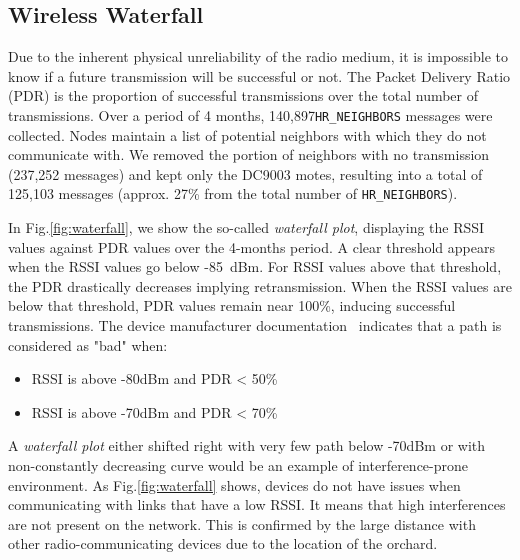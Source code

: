 \documentclass{sig-alternate}
\newcommand{\HRNEIGHBORS}    {{\tt HR\_NEIGHBORS}\xspace}
\newcommand{\HRNEIGHBORSTOTALNUMBER}     {140,897}
\begin{document}
\subsection{Wireless Waterfall}


Due to the inherent physical unreliability of the radio medium, it is impossible to know if a future transmission will be successful or not.
The Packet Delivery Ratio (PDR) is the proportion of successful transmissions over the total number of transmissions.
Over a period of 4 months, \HRNEIGHBORSTOTALNUMBER \HRNEIGHBORS messages were collected.
Nodes maintain a list of potential neighbors with which they do not communicate with.
We removed the portion of neighbors with no transmission (237,252 messages) and kept only the DC9003 motes, resulting into a total of 125,103 messages (approx. 27\% from the total number of \HRNEIGHBORS).


In Fig.\ref{fig:waterfall}, we show the so-called \textit{waterfall plot}, displaying the RSSI values against PDR values over the 4-months period.
A clear threshold appears when the RSSI values go below -85~dBm.
For RSSI values above that threshold, the PDR drastically decreases implying retransmission.
When the RSSI values are below that threshold, PDR values remain near 100\%, inducing successful transmissions.
The device manufacturer documentation~\cite{smip_app_note} indicates that a path is considered as "bad" when:

\begin{itemize}
  \item RSSI is above -80dBm and PDR < 50\%
  \item RSSI is above -70dBm and PDR < 70\%
\end{itemize}


A \textit{waterfall plot} either shifted right with very few path below -70dBm or with non-constantly decreasing curve would be an example of interference-prone environment.
As Fig.\ref{fig:waterfall} shows, devices do not have issues when communicating with links that have a low RSSI.
It means that high interferences are not present on the network.
This is confirmed by the large distance with other radio-communicating devices due to the location of the orchard.
\end{document}
